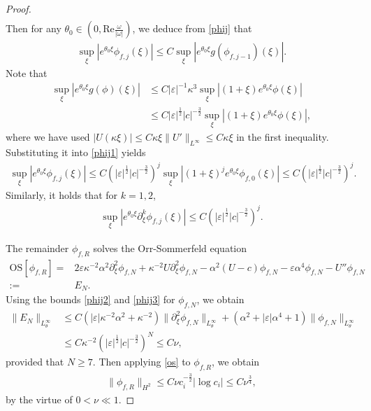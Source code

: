 \documentclass[reqno,11pt]{amsart}
\numberwithin{equation}{section}
\numberwithin{equation}{section}
\theoremstyle{plain}
\begin{document}
\begin{proof}
\begin{align}
\end{align}
 Then for any $\theta_0\in \left(0, \text{Re}\frac{\omega}{|\omega|}\right)$, we deduce  from \eqref{phij} that
\begin{align}
	\sup_{\xi}|e^{\theta_0\xi}\phi_{f,j}(\xi)|\leq C\sup_{\xi}|e^{\theta_0\xi} g(\phi_{f,j-1})(\xi)|.\label{phij1}
\end{align} 
Note that
\begin{align}
	\sup_{\xi}|e^{\theta_0\xi}g(\phi)(\xi)|&\leq C|\varepsilon|^{-1}\kappa^3\sup_\xi|(1+\xi)e^{\theta_0\xi}\phi(\xi)|\nonumber\\
	&\leq C|\varepsilon|^{\frac12}|c|^{-\frac32}\sup_\xi|(1+\xi)e^{\theta_0\xi}\phi(\xi)|,\nonumber
\end{align}
where we have used $|U(\kappa\xi)|\leq C\kappa\xi\|U'\|_{L^\infty}\leq C\kappa\xi$ in the first inequality. Substituting it into \eqref{phij1} yields
\begin{align}\label{phij2}
	\sup_{\xi}|e^{\theta_0\xi}\phi_{f,j}(\xi)|\leq C(|\varepsilon|^{\frac12}|c|^{-\frac32})^{j}	\sup_{\xi}|(1+\xi)^je^{\theta_0\xi}\phi_{f,0}(\xi)|\leq C(|\varepsilon|^{\frac12}|c|^{-\frac32})^{j}.
\end{align}
Similarly, it holds that for $k=1,2$, 
\begin{align}
	\sup_{\xi}|e^{\theta_0\xi}\partial_\xi^k\phi_{f,j}(\xi)|\leq C(|\varepsilon|^{\frac12}|c|^{-\frac32})^{j}.\label{phij3}
\end{align}

The remainder $\phi_{f,R}$ solves the Orr-Sommerfeld equation
\begin{align}
	\mathrm{OS}[\phi_{f,R}]=&2\varepsilon \kappa^{-2}\alpha^2\partial_\xi^2\phi_{f,N}+\kappa^{-2}U\partial_\xi^2\phi_{f,N}-\alpha^2(U-c)\phi_{f,N}-\varepsilon\alpha^4\phi_{f,N}-U''\phi_{f,N}\nonumber\\
	:=& E_{N}.\nonumber
\end{align}
Using the bounds \eqref{phij2} and \eqref{phij3} for $\phi_{f,N}$, we obtain
$$\begin{aligned}
\|E_N\|_{L^\infty_{\theta}}&\leq C\left(|\varepsilon|\kappa^{-2}\alpha^2 +\kappa^{-2}\right)\|\partial_\xi^2\phi_{f,N}\|_{L^\infty_{\theta}}
+\left(\alpha^2+|\varepsilon|\alpha^4+1\right)\|\phi_{f,N}\|_{L^\infty_{\theta}}\\
&\leq C\kappa^{-2}(|\varepsilon|^{\frac{1}{2}}|c|^{-\frac32})^N\leq C\nu,
\end{aligned}
$$
provided that $N\geq 7.$ Then applying \eqref{os} to $\phi_{f,R}$, we obtain
\begin{align}
	\|\phi_{f,R}\|_{H^2}\leq C\nu c_i^{-\frac32}|\log c_i|\leq C\nu^{\frac34},\label{phij4}
\end{align}
by the virtue of $0<\nu\ll1$. 


\end{proof}
\end{document}
